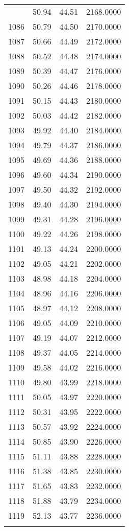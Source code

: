 \documentclass[
  captions=tableheading,
]{scrartcl}
\begin{document}
\begin{longtable} {l|l|l|l}
{1085 &	50.94 &	44.51 &	2168.0000\\
1086 &	50.79 &	44.50 &	2170.0000\\
1087 &	50.66 &	44.49 &	2172.0000\\
1088 &	50.52 &	44.48 &	2174.0000\\
1089 &	50.39 &	44.47 &	2176.0000\\
1090 &	50.26 &	44.46 &	2178.0000\\
1091 &	50.15 &	44.43 &	2180.0000\\
1092 &	50.03 &	44.42 &	2182.0000\\
1093 &	49.92 &	44.40 &	2184.0000\\
1094 &	49.79 &	44.37 &	2186.0000\\
1095 &	49.69 &	44.36 &	2188.0000\\
1096 &	49.60 &	44.34 &	2190.0000\\
1097 &	49.50 &	44.32 &	2192.0000\\
1098 &	49.40 &	44.30 &	2194.0000\\
1099 &	49.31 &	44.28 &	2196.0000\\
1100 &	49.22 &	44.26 &	2198.0000\\
1101 &	49.13 &	44.24 &	2200.0000\\
1102 &	49.05 &	44.21 &	2202.0000\\
1103 &	48.98 &	44.18 &	2204.0000\\
1104 &	48.96 &	44.16 &	2206.0000\\
1105 &	48.97 &	44.12 &	2208.0000\\
1106 &	49.05 &	44.09 &	2210.0000\\
1107 &	49.19 &	44.07 &	2212.0000\\
1108 &	49.37 &	44.05 &	2214.0000\\
1109 &	49.58 &	44.02 &	2216.0000\\
1110 &	49.80 &	43.99 &	2218.0000\\
1111 &	50.05 &	43.97 &	2220.0000\\
1112 &	50.31 &	43.95 &	2222.0000\\
1113 &	50.57 &	43.92 &	2224.0000\\
1114 &	50.85 &	43.90 &	2226.0000\\
1115 &	51.11 &	43.88 &	2228.0000\\
1116 &	51.38 &	43.85 &	2230.0000\\
1117 &	51.65 &	43.83 &	2232.0000\\
1118 &	51.88 &	43.79 &	2234.0000\\
1119 &	52.13 &	43.77 &	2236.0000\\
}
\end{longtable}
\end{document}
